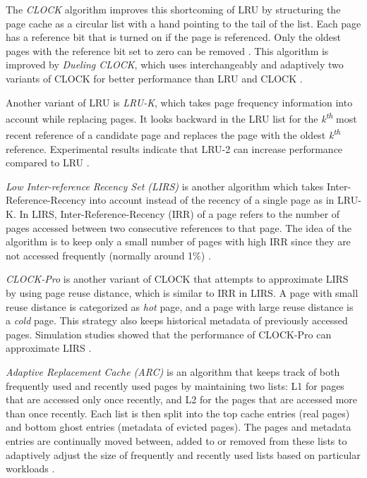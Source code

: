 The \textit{CLOCK} algorithm improves this shortcoming of LRU by 
structuring the page cache as a circular list with a hand pointing to 
the tail of the list.
Each page has a reference bit that is turned on if the page is referenced. 
Only the oldest pages with the reference bit set to zero can be removed 
\cite{chavan2011comparison}. 
This algorithm is improved by \textit{Dueling CLOCK}, which uses 
interchangeably and adaptively two variants of CLOCK for better 
performance than LRU and CLOCK \cite{chavan2011comparison}.

Another variant of LRU is \textit{LRU-K}, which takes page frequency 
information  into account while replacing pages. It looks backward in the 
LRU list for the \textit{k\textsuperscript{th}} most recent reference of 
a candidate page and replaces the page with the oldest 
\textit{k\textsuperscript{th}} reference. 
Experimental results indicate that LRU-2 can increase performance 
compared to LRU \cite{chavan2011comparison}. 

\textit{Low Inter-reference Recency Set (LIRS)} is another algorithm 
which takes Inter-Reference-Recency into account instead of the recency 
of a single page as in LRU-K. 
In LIRS, Inter-Reference-Recency (IRR) of a page refers to the 
number of pages accessed between two consecutive references to that page. 
The idea of the algorithm is to keep only a small number of pages with 
high IRR since they are not accessed frequently (normally around 1\%) 
\cite{chavan2011comparison}. 

\textit{CLOCK-Pro} is another variant of CLOCK that attempts to approximate 
LIRS by using page reuse distance, which is similar to IRR in LIRS. 
A page with small reuse distance is categorized as \textit{hot} page, 
and a page with large reuse distance is a \textit{cold} page. This strategy also 
keeps historical metadata of previously accessed pages. 
Simulation studies showed that the performance of CLOCK-Pro can 
approximate LIRS \cite{chavan2011comparison}. 

\textit{Adaptive Replacement Cache (ARC)} is an algorithm that keeps track of
both frequently used and recently used pages by maintaining two lists: 
L1 for pages that are accessed only once recently, and L2 for the pages 
that are accessed more than once recently. 
Each list is then split into the top cache entries (real pages) and bottom 
ghost entries (metadata of evicted pages). 
The pages and metadata entries are continually moved between, 
added to or removed from these lists to adaptively adjust the size 
of frequently and recently used lists based on particular workloads  
\cite{chavan2011comparison}. 

